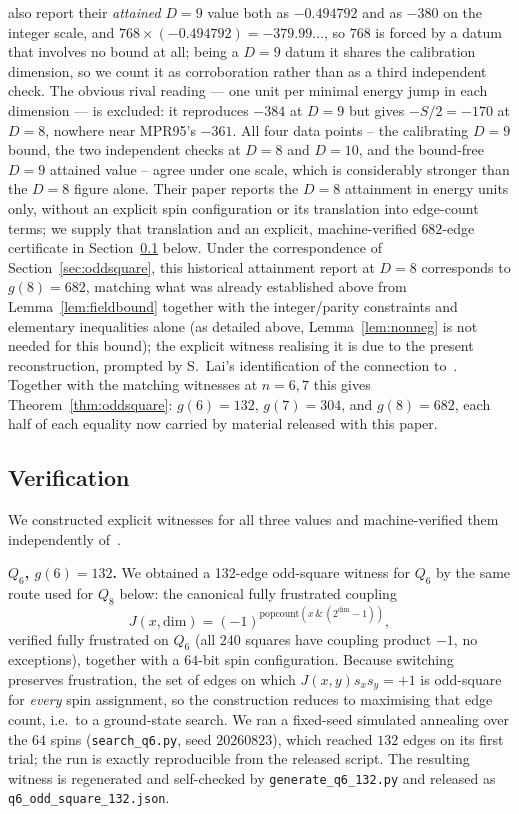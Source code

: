 \documentclass[12pt]{article}
\begin{document}
also report their \emph{attained} $D=9$ value both as $-0.494792$ and as
$-380$ on the integer scale, and $768\times(-0.494792)=-379.99\ldots$, so $768$
is forced by a datum that involves no bound at all; being a $D=9$ datum it
shares the calibration dimension, so we count it as corroboration rather than
as a third independent check. The obvious rival reading
--- one unit per minimal energy jump in each dimension --- is excluded: it
reproduces $-384$ at $D=9$ but gives $-S/2=-170$ at $D=8$, nowhere near
MPR95's $-361$. All four data points -- the calibrating $D=9$ bound, the two
independent checks at $D=8$ and $D=10$, and the bound-free $D=9$ attained
value -- agree under one scale, which is considerably stronger than the
$D=8$ figure alone.
Their paper reports
the $D=8$ attainment in energy units only, without an explicit spin configuration
or its translation into edge-count terms; we supply that translation
and an explicit, machine-verified $682$-edge certificate in
Section~\ref{sec:oddsquareverify} below. Under the correspondence of
Section~\ref{sec:oddsquare}, this historical attainment report at $D=8$
corresponds to $g(8)=682$, matching what was already established above
from Lemma~\ref{lem:fieldbound} together with the
integer/parity constraints and elementary inequalities alone (as
detailed above, Lemma~\ref{lem:nonneg} is not needed for this bound);
the explicit
witness realising it
is due to the present reconstruction, prompted by S.~Lai's
identification of the connection to~\cite{DPTV79,MPR95}. Together with
the matching witnesses at $n=6,7$ this gives
Theorem~\ref{thm:oddsquare}: $g(6)=132$, $g(7)=304$, and $g(8)=682$,
each half of each equality now carried by material released with this
paper.

\subsection{Verification}\label{sec:oddsquareverify}

We constructed explicit witnesses for all three values and
machine-verified them independently of~\cite{DPTV79,MPR95,HN94}.

\textbf{$Q_6$, $g(6)=132$.} We obtained a 132-edge odd-square witness
for $Q_6$ by the same route used for $Q_8$ below: the canonical fully
frustrated coupling
\[
J(x,\mathrm{dim})=(-1)^{\mathrm{popcount}(x\,\&\,(2^{\mathrm{dim}}-1))},
\]
verified fully frustrated on $Q_6$ (all $240$ squares have coupling
product $-1$, no exceptions), together with a $64$-bit spin
configuration. Because switching preserves frustration, the set of
edges on which $J(x,y)s_xs_y=+1$ is odd-square for \emph{every} spin
assignment, so the construction reduces to maximising that edge count,
i.e.\ to a ground-state search. We ran a fixed-seed simulated
annealing over the $64$ spins (\texttt{search\_q6.py}, seed
$20260823$), which reached $132$ edges on its first trial; the run is
exactly reproducible from the released script. The resulting witness is
regenerated and self-checked by \texttt{generate\_q6\_132.py} and
released as \texttt{q6\_odd\allowbreak\_square\_132.json}.
\end{document}
